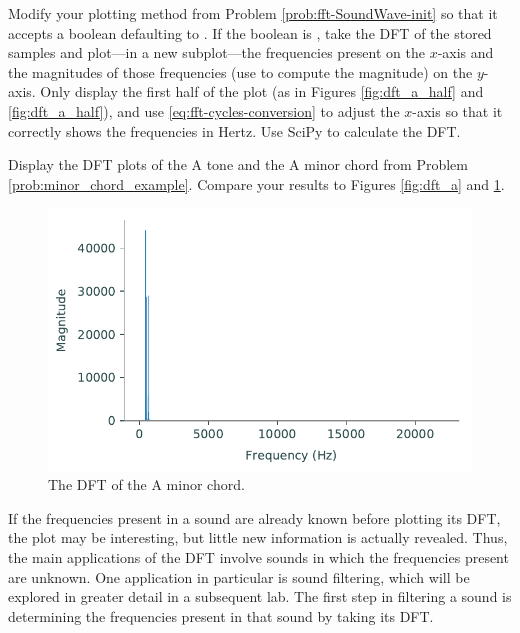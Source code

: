 
\begin{problem} %
Modify your  plotting method from Problem \ref{prob:fft-SoundWave-init} so that it accepts a boolean defaulting to .
If the boolean is , take the DFT of the stored samples and plot---in a new subplot---the frequencies present on the $x$-axis and the magnitudes of those frequencies (use  to compute the magnitude) on the $y$-axis.
Only display the first half of the plot (as in Figures \ref{fig:dft_a_half} and \ref{fig:dft_a_half}), and use \eqref{eq:fft-cycles-conversion} to adjust the $x$-axis so that it correctly shows the frequencies in Hertz.
Use SciPy to calculate the DFT.

Display the DFT plots of the A tone and the A minor chord from Problem \ref{prob:minor_chord_example}.
Compare your results to Figures \ref{fig:dft_a} and \ref{fig:dft_chord}.
\end{problem}

\begin{figure}[H] %
\centering
\includegraphics[width=.7\textwidth]{figures/dft_chord.pdf}
\caption{The DFT of the A minor chord.}
\label{fig:dft_chord}
\end{figure}

If the frequencies present in a sound are already known before plotting its DFT, the plot may be interesting, but little new information is actually revealed.
Thus, the main applications of the DFT involve sounds in which the frequencies present are unknown.
One application in particular is sound filtering, which will be explored in greater detail in a subsequent lab.
The first step in filtering a sound is determining the frequencies present in that sound by taking its DFT.

